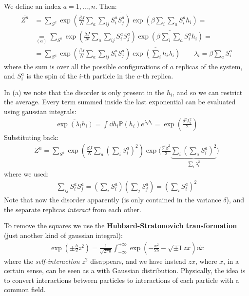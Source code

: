 \documentclass[../template.tex]{subfiles}
\begin{document}
We define an index $a = 1, \dots, n$. Then:
\begin{align*}
    \overline{Z^n} &= \overline{\sum_{S^a} \exp\left(\frac{\beta J}{N} \sum_a \sum_{ij} S_i^a S_j^a\right) \exp \left(\beta \sum_i \sum_a S_i^a h_i\right)} =\\
    &\underset{(a)}{=}  \sum_{S^a} \exp\left(\frac{\beta J}{N} \sum_a \sum_{ij} S_i^a S_j^a\right) \overline{\exp \left(\beta \sum_i \sum_a S_i^a h_i\right)} = \\
    &= \sum_{S^a} \exp\left(\frac{\beta J}{N} \sum_a \sum_{ij} S_i^a S_j^a \right) \overline{\exp\left(\sum_i h_i \lambda_i \right)} \qquad \lambda_i = \beta \sum_a S_i^a
\end{align*} 
where the sum is over all the possible configurations of $a$ replicas of the system, and $S_i^a$ is the spin of the $i$-th particle in the $a$-th replica. 

In (a) we note that the disorder is only present in the $h_i$, and so we can restrict the average. Every term summed inside the last exponential can be evaluated using gaussian integrals:
\begin{align*}
    \overline{\exp\left(\lambda_i h_i\right)} = \int \dd{h_i} \mathbb{P}(h_i) e^{\lambda_i h_i} = \exp\left(\frac{\delta^2 \lambda_i^2}{2} \right)
\end{align*}
Substituting back:
\begin{align*}
    \overline{Z^n} = \sum_{S^a} \exp\left(\frac{\beta J }{N} \sum_a \left(\sum_i S_i^a\right)^2 \right) \exp\Big(\frac{\delta^2 \beta^2}{2} \underbrace{\sum_i \left(\sum_a S_i^a\right)^2}_{\sum_i \lambda_i^2}  \Big)
\end{align*}
where we used:
\begin{align*}
    \sum_{ij} S_i^a S_j^a = \left(\sum_i S_i^a\right)\left(\sum_j S_j^a\right) = \left(\sum_i S_i^a\right)^2
\end{align*}
Note that now the disorder apparently  (is only contained in the variance $\delta$), and the separate replicas \textit{interact} from each other.  

To remove the squares we use the \textbf{Hubbard-Stratonovich transformation} (just another kind of gaussian integral):
\begin{align*}
    \exp\left(\pm \frac{b}{2} z^2 \right) = \frac{1}{\sqrt{2 \pi b}} \int_{-\infty}^{+\infty} \exp\left(-\frac{x^2}{2b} - \sqrt{\pm 1} z x \right) \dd{x}
\end{align*} 
where the \textit{self-interaction} $z^2$ disappears, and we have instead $z x$, where $x$, in a certain sense, can be seen as a  with Gaussian distribution. Physically, the idea is to convert interactions between particles to interactions of each particle with a common field. 
\end{document}
